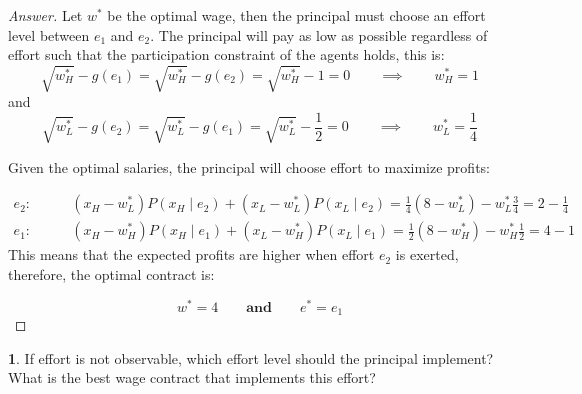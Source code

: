 \documentclass[12pt]{article}
\theoremstyle{definition}
\newtheorem{subproblem}{}[problem]
\newcommand{\qiq}{\qquad \implies \qquad}
\newcommand{\qaq}{\qquad \textbf{and} \qquad}
\begin{document}
\begin{proof}[Answer]
Let $w^*$ be the optimal wage, then the principal must choose an effort level between $e_1$ and $e_2$. The principal will pay as low as possible regardless of effort such that the participation constraint of the agents holds, this is:
$$\sqrt{w_H^*}-g(e_1)=\sqrt{w_H^*}-g(e_2)=\sqrt{w_H^*}-1 = 0 \qiq w_H^* = 1$$
and
$$\sqrt{w_L^*}-g(e_2)=\sqrt{w_L^*}-g(e_1)=\sqrt{w_L^*}-\frac{1}{2} = 0 \qiq w_L^* = \frac{1}{4}$$

Given the optimal salaries, the principal will choose effort to maximize profits:

\begin{align*}
    e_2:&\qquad (x_H-w_L^*)P(x_H\mid e_2) + (x_L-w_L^*)P(x_L\mid e_2) = \frac{1}{4}(8-w_L^*)-w_L^*\frac{3}{4}=2-\frac{1}{4} 
    \\e_1:&\qquad (x_H-w_H^*)P(x_H\mid e_1) + (x_L-w_H^*)P(x_L\mid e_1) = \frac{1}{2}(8-w_H^*)-w_H^*\frac{1}{2}=4-1
\end{align*}
This means that the expected profits are higher when effort $e_2$ is exerted, therefore, the optimal contract is:

$$\boxed{w^* = 4} \qaq \boxed{e^* = e_1}$$
\end{proof}
\begin{subproblem}
If effort is not observable, which effort level should the principal implement? What is the best wage contract that implements this effort?
\end{subproblem}
\end{document}
